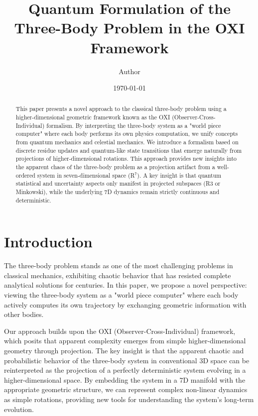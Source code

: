 \documentclass{article}
\title{Quantum Formulation of the Three-Body Problem in the OXI Framework}
\author{Author}
\date{\today}
\begin{document}
\maketitle

\begin{abstract}
This paper presents a novel approach to the classical three-body problem using a higher-dimensional geometric framework known as the OXI (Observer-Cross-Individual) formalism. By interpreting the three-body system as a "world piece computer" where each body performs its own physics computation, we unify concepts from quantum mechanics and celestial mechanics. We introduce a formalism based on discrete residue updates and quantum-like state transitions that emerge naturally from projections of higher-dimensional rotations. This approach provides new insights into the apparent chaos of the three-body problem as a projection artifact from a well-ordered system in seven-dimensional space (R$^7$). A key insight is that quantum statistical and uncertainty aspects only manifest in projected subspaces (R3 or Minkowski), while the underlying 7D dynamics remain strictly continuous and deterministic.
\end{abstract}

\section{Introduction}

The three-body problem stands as one of the most challenging problems in classical mechanics, exhibiting chaotic behavior that has resisted complete analytical solutions for centuries. In this paper, we propose a novel perspective: viewing the three-body system as a "world piece computer" where each body actively computes its own trajectory by exchanging geometric information with other bodies.

Our approach builds upon the OXI (Observer-Cross-Individual) framework, which posits that apparent complexity emerges from simple higher-dimensional geometry through projection. The key insight is that the apparent chaotic and probabilistic behavior of the three-body system in conventional 3D space can be reinterpreted as the projection of a perfectly deterministic system evolving in a higher-dimensional space. By embedding the system in a 7D manifold with the appropriate geometric structure, we can represent complex non-linear dynamics as simple rotations, providing new tools for understanding the system's long-term evolution.
\end{document}
